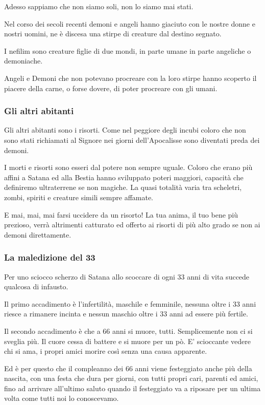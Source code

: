 \documentclass[12pt,a4paper,twoside,openany]{book}
\begin{document}
\begin{multicols}{2}
Adesso sappiamo che non siamo soli, non lo siamo mai stati.

Nel corso dei secoli recenti demoni e angeli hanno giaciuto con le nostre donne e nostri uomini, ne è discesa una stirpe di creature dal destino segnato.

I nefilim sono creature figlie di due mondi, in parte umane in parte angeliche o demoniache.

Angeli e Demoni che non potevano procreare con la loro stirpe hanno scoperto il piacere della carne, o forse dovere, di poter procreare con gli umani.

\subsubsection{Gli altri abitanti}

Gli altri abitanti sono i risorti. Come nel peggiore degli incubi coloro che non sono stati richiamati al Signore nei giorni dell'Apocalisse sono diventati preda dei demoni.

I morti e risorti sono esseri dal potere non sempre uguale. Coloro che erano più affini a Satana ed alla Bestia hanno sviluppato poteri maggiori, capacità che definiremo ultraterrene se non magiche. La quasi totalità varia tra scheletri, zombi, spiriti e creature simili sempre affamate.

E mai, mai, mai farsi uccidere da un risorto! La tua anima, il tuo bene più prezioso, verrà altrimenti catturato ed offerto ai risorti di più alto grado se non ai demoni direttamente.

\subsubsection{La maledizione del 33}

Per uno sciocco scherzo di Satana allo scoccare di ogni 33 anni di vita succede qualcosa di infausto. 

Il primo accadimento è l'infertilità, maschile e femminile, nessuna oltre i 33 anni riesce a rimanere incinta e nessun maschio oltre i 33 anni ad essere più fertile.

Il secondo accadimento è che a 66 anni si muore, tutti. Semplicemente non ci si sveglia più. Il cuore cessa di battere e si muore per un pò.
E' scioccante vedere chi si ama, i propri amici morire così senza una causa apparente.

Ed è per questo che il compleanno dei 66 anni viene festeggiato anche più della nascita, con una festa che dura per giorni, con tutti propri cari, parenti ed amici, fino ad arrivare all'ultimo saluto quando il festeggiato va a riposare per un ultima volta come tutti noi lo conoscevamo.


\end{multicols}
\end{document}
